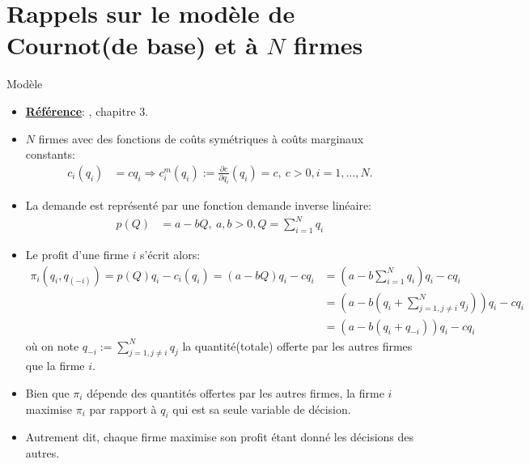 \section{Rappels sur le modèle de Cournot(de base) et à $N$ firmes}
\frame{\sectionpage}
\begin{frame}[allowframebreaks]{Modèle}
\begin{itemize}
\item \textbf{\underline{Référence}}: \cite{belleflamme_peitz_2015}, chapitre 3.
\item $N$ firmes avec des fonctions de coûts symétriques à coûts marginaux constants:
\begin{align*}
    c_i(q_i) &=cq_i \Rightarrow c^m_i(q_i):= \frac{\partial c}{\partial q_i}(q_i) = c, \ c > 0, i=1, \ldots, N.
\end{align*}
\item La demande est représenté par une fonction demande inverse linéaire:
\begin{align*}
p(Q) &= a-bQ, \ a, b > 0, Q = \sum_{i=1}^N q_i
\end{align*}
\item Le profit d'une firme $i$ s'écrit alors: 
\begin{align*}
\pi_i(q_i, q_{(-i)}) = p(Q)q_i - c_i(q_i) =  (a-bQ)q_i - cq_i &= (a-b\sum_{i=1}^N q_i)q_i - cq_i\\
& = \left(a-b(q_i + \sum_{j=1, j\neq i}^N q_j)\right)q_i - cq_i\\
&= \left(a-b(q_i + q_{-i})\right)q_i - cq_i
\end{align*}
où on note $q_{-i}:= \sum_{j=1, j\neq i}^N q_j $ la quantité(totale) offerte par les autres firmes que la firme $i$.
\item Bien que $\pi_i$ dépende des quantités offertes par les autres firmes, 
la firme $i$ maximise $\pi_i$ par rapport à $q_i$ qui est sa seule variable de décision.
\item Autrement dit, chaque firme maximise son profit étant donné les décisions des autres.
\end{itemize}
\end{frame}

